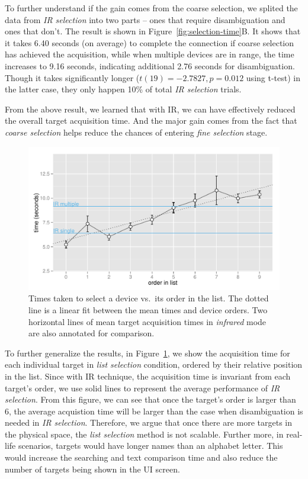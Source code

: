 To further understand if the gain comes from the coarse selection, we splited the data from {\em IR selection} into two parts -- ones that require disambiguation and ones that don't. The result is shown in Figure~\ref{fig:selection-time}B. It shows that it takes 6.40 seconds (on average) to complete the connection if coarse selection has achieved the acquisition, while when multiple devices are in range, the time increases to 9.16 seconds, indicating additional 2.76 seconds for disambiguation. Though it takes significantly longer ($t(19)=-2.7827, p=0.012$ using t-test) in the latter case, they only happen 10\% of total {\em IR selection} trials.

From the above result, we learned that with IR, we can have effectively reduced the overall target acquisition time. And the major gain comes from the fact that {\em coarse selection} helps reduce the chances of entering {\em fine selection} stage. 

\begin{figure}[t]
\centering
\includegraphics[width=1.0\columnwidth]{figures/R_List_by_Target.pdf}
\caption{Times taken to select a device vs.~its order in the list. The dotted line is a linear fit between the mean times and device orders. Two horizontal lines of mean target acquisition times in {\em infrared} mode are also annotated for comparison.}
\label{fig:time-vs-list-order}
\end{figure}

To further generalize the results, in Figure~\ref{fig:time-vs-list-order}, we show the acquisition time for each individual target in {\em list selection} condition, ordered by their relative position in the list. Since with IR technique, the acquisition time is invariant from each target's order, we use solid lines to represent the average performance of {\em IR selection}. From this figure, we can see that once the target's order is larger than 6, the average acquistion time will be larger than the case when disambiguation is needed in {\em IR selection}. Therefore, we argue that once there are more targets in the physical space, the {\em list selection} method is not scalable. Further more, in real-life scenarios, targets would have longer names than an alphabet letter. This would increase the searching and text comparison time and also reduce the number of targets being shown in the UI screen.

